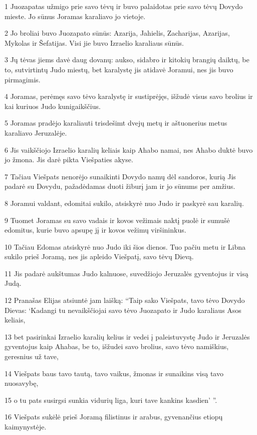 \par 1 Juozapatas užmigo prie savo tėvų ir buvo palaidotas prie savo tėvų Dovydo mieste. Jo sūnus Joramas karaliavo jo vietoje. 
\par 2 Jo broliai buvo Juozapato sūnūs: Azarija, Jahielis, Zacharijas, Azarijas, Mykolas ir Šefatijas. Visi jie buvo Izraelio karaliaus sūnūs. 
\par 3 Jų tėvas jiems davė daug dovanų: aukso, sidabro ir kitokių brangių daiktų, be to, sutvirtintų Judo miestų, bet karalystę jis atidavė Joramui, nes jis buvo pirmagimis. 
\par 4 Joramas, perėmęs savo tėvo karalystę ir sustiprėjęs, išžudė visus savo brolius ir kai kuriuos Judo kunigaikščius. 
\par 5 Joramas pradėjo karaliauti trisdešimt dvejų metų ir aštuonerius metus karaliavo Jeruzalėje. 
\par 6 Jis vaikščiojo Izraelio karalių keliais kaip Ahabo namai, nes Ahabo duktė buvo jo žmona. Jis darė pikta Viešpaties akyse. 
\par 7 Tačiau Viešpats nenorėjo sunaikinti Dovydo namų dėl sandoros, kurią Jis padarė su Dovydu, pažadėdamas duoti žiburį jam ir jo sūnums per amžius. 
\par 8 Joramui valdant, edomitai sukilo, atsiskyrė nuo Judo ir paskyrė sau karalių. 
\par 9 Tuomet Joramas su savo vadais ir kovos vežimais naktį puolė ir sumušė edomitus, kurie buvo apsupę jį ir kovos vežimų viršininkus. 
\par 10 Tačiau Edomas atsiskyrė nuo Judo iki šios dienos. Tuo pačiu metu ir Libna sukilo prieš Joramą, nes jis apleido Viešpatį, savo tėvų Dievą. 
\par 11 Jis padarė aukštumas Judo kalnuose, suvedžiojo Jeruzalės gyventojus ir visą Judą. 
\par 12 Pranašas Elijas atsiuntė jam laišką: “Taip sako Viešpats, tavo tėvo Dovydo Dievas: ‘Kadangi tu nevaikščiojai savo tėvo Juozapato ir Judo karaliaus Asos keliais, 
\par 13 bet pasirinkai Izraelio karalių kelius ir vedei į paleistuvystę Judo ir Jeruzalės gyventojus kaip Ahabas, be to, išžudei savo brolius, savo tėvo namiškius, geresnius už tave, 
\par 14 Viešpats baus tavo tautą, tavo vaikus, žmonas ir sunaikins visą tavo nuosavybę, 
\par 15 o tu pats susirgsi sunkia vidurių liga, kuri tave kankins kasdien’ ”. 
\par 16 Viešpats sukėlė prieš Joramą filistinus ir arabus, gyvenančius etiopų kaimynystėje. 
